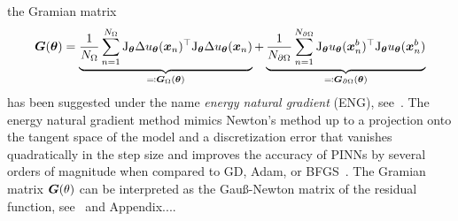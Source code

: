 the Gramian matrix
\begin{equation}\label{eq:gramian}
  \mG(\vtheta) = %
  \underbrace{\frac1{{N_\Omega}} \sum_{n=1}^{N_\Omega} \jac_{\vtheta} \Delta u_\vtheta(\vx_n)^\top \jac_{\vtheta} \Delta u_\vtheta(\vx_n)}_{\eqqcolon \mG_\Omega(\vtheta)} + \underbrace{\frac1{{N_{\partial\Omega}}} \sum_{n=1}^{N_{\partial\Omega}} \jac_{\vtheta} u_\vtheta(\vx_n^b)^\top \jac_{\vtheta} u_\vtheta (\vx_n^b)}_{\eqqcolon \mG_{\partial\Omega}(\vtheta)}
\end{equation}
has been suggested under the name \emph{energy natural gradient} (ENG), see~\cite{muller2023achieving}.
The energy natural gradient method mimics Newton's method up to a projection onto the tangent space of the model and a discretization error that vanishes quadratically in the step size
and improves the accuracy of PINNs by several orders of magnitude when compared to GD, Adam, or BFGS~\citep{muller2023achieving, ?}.
The Gramian matrix ${\bm{G}}(\theta)$ can be interpreted as the Gauß-Newton matrix of the residual function, see~\cite{} and Appendix....


